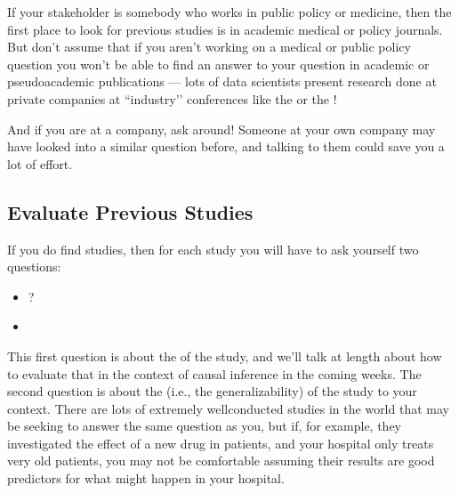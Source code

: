 \documentclass[letterpaper,10pt,english]{jupyterBook}
\begin{document}
\sphinxAtStartPar
If your stakeholder is somebody who works in public policy or medicine, then the first place to look for previous studies is in academic medical or policy journals. But don’t assume that if you aren’t working on a medical or public policy question you won’t be able to find an answer to your question in academic or pseudo\sphinxhyphen{}academic publications — lots of data scientists present research done at private companies at ``industry’’ conferences like the  or the !

\sphinxAtStartPar
And if you are at a company, ask around! Someone at your own company may have looked into a similar question before, and talking to them could save you a lot of effort.


\subsection{Evaluate Previous Studies}
\label{\detokenize{30_questions/30_using_causal_questions:evaluate-previous-studies}}
\sphinxAtStartPar
If you do find studies, then for each study you will have to ask yourself two questions:
\begin{itemize}
\item {} 
\sphinxAtStartPar
{}?

\item {} 
\sphinxAtStartPar
{}

\end{itemize}

\sphinxAtStartPar
This first question is about the  of the study, and we’ll talk at length about how to evaluate that in the context of causal inference in the coming weeks. The second question is about the  (i.e., the generalizability) of the study to your context. There are lots of extremely well\sphinxhyphen{}conducted studies in the world that may be seeking to answer the same question as you, but if, for example, they investigated the effect of a new drug in  patients, and your hospital only treats very old patients, you may not be comfortable assuming their results are good predictors for what might happen in your hospital.
\end{document}
